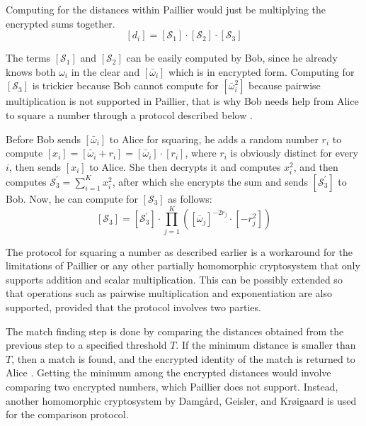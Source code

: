 Computing for the distances within Paillier would just be multiplying the encrypted sums together.
\[
\left[d_i\right] = \left[\mathcal{S}_1\right] \cdot \left[\mathcal{S}_2\right] \cdot \left[\mathcal{S}_3\right]
\]

The terms $\left[\mathcal{S}_1\right]$ and $\left[\mathcal{S}_2\right]$ can be easily computed by Bob, since he already knows both $\omega_i$ in the clear and $\left[\bar{\omega}_i\right]$ which is in encrypted form. Computing for $\left[\mathcal{S}_3\right]$ is trickier because Bob cannot compute for $\left[\bar{\omega}_i^2\right]$ because pairwise multiplication is not supported in Paillier, that is why Bob needs help from Alice to square a number through a protocol described below \cite{hutchison_privacy-preserving_2009-2}.

Before Bob sends $\left[\bar{\omega}_i\right]$ to Alice for squaring, he adds a random number $r_i$ to compute $\left[x_i\right] = \left[\bar{\omega}_i + r_i\right] = \left[\bar{\omega}_i\right] \cdot \left[r_i\right]$, where $r_i$ is obviously distinct for every $i$, then sends $\left[x_i\right]$ to Alice. She then decrypts it and computes $x_i^2$, and then computes $\mathcal{S}_3^\prime = \sum_{i=1}^{K} x_i^2$, after which she encrypts the sum and sends $\left[\mathcal{S}_3^\prime\right]$ to Bob. Now, he can compute for $\left[\mathcal{S}_3\right]$ as follows:
\[
\left[\mathcal{S}_3\right] = \left[\mathcal{S}_3^\prime\right] \cdot \prod_{j=1}^{K} \left(\left[\bar{\omega}_j\right]^{-2r_j} \cdot \left[-r_j^2\right]\right)
\]

The protocol for squaring a number as described earlier is a workaround for the limitations of Paillier or any other partially homomorphic cryptosystem that only supports addition and scalar multiplication. This can be possibly extended so that operations such as pairwise multiplication and exponentiation are also supported, provided that the protocol involves two parties. 

The match finding step is done by comparing the distances obtained from the previous step to a specified threshold $T$. If the minimum distance is smaller than $T$, then a match is found, and the encrypted identity of the match is returned to Alice \cite{hutchison_privacy-preserving_2009-2}. Getting the minimum among the encrypted distances would involve comparing two encrypted numbers, which Paillier does not support. Instead, another homomorphic cryptosystem by Damg{\aa}rd, Geisler, and Kr{\o}igaard \cite{pieprzyk_efficient_2007} is used for the comparison protocol.

